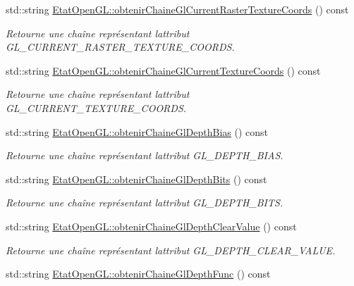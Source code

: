\begin{DoxyCompactItemize}
std\+::string \hyperlink{group__utilitaire_gae1b30e504db9237dce13eade239c8c5a}{Etat\+Open\+G\+L\+::obtenir\+Chaine\+Gl\+Current\+Raster\+Texture\+Coords} () const 
\begin{DoxyCompactList}\small\item\em Retourne une chaîne représentant l\textquotesingle{}attribut G\+L\+\_\+\+C\+U\+R\+R\+E\+N\+T\+\_\+\+R\+A\+S\+T\+E\+R\+\_\+\+T\+E\+X\+T\+U\+R\+E\+\_\+\+C\+O\+O\+R\+D\+S. \end{DoxyCompactList}\item 
std\+::string \hyperlink{group__utilitaire_ga5bf6abadfe9d63e576d34c94c93ee8f0}{Etat\+Open\+G\+L\+::obtenir\+Chaine\+Gl\+Current\+Texture\+Coords} () const 
\begin{DoxyCompactList}\small\item\em Retourne une chaîne représentant l\textquotesingle{}attribut G\+L\+\_\+\+C\+U\+R\+R\+E\+N\+T\+\_\+\+T\+E\+X\+T\+U\+R\+E\+\_\+\+C\+O\+O\+R\+D\+S. \end{DoxyCompactList}\item 
std\+::string \hyperlink{group__utilitaire_gae3e587b7e9f860f3874823a3c4ab7d71}{Etat\+Open\+G\+L\+::obtenir\+Chaine\+Gl\+Depth\+Bias} () const 
\begin{DoxyCompactList}\small\item\em Retourne une chaîne représentant l\textquotesingle{}attribut G\+L\+\_\+\+D\+E\+P\+T\+H\+\_\+\+B\+I\+A\+S. \end{DoxyCompactList}\item 
std\+::string \hyperlink{group__utilitaire_gae1dffc44c8e27d7cb249064cfe35653e}{Etat\+Open\+G\+L\+::obtenir\+Chaine\+Gl\+Depth\+Bits} () const 
\begin{DoxyCompactList}\small\item\em Retourne une chaîne représentant l\textquotesingle{}attribut G\+L\+\_\+\+D\+E\+P\+T\+H\+\_\+\+B\+I\+T\+S. \end{DoxyCompactList}\item 
std\+::string \hyperlink{group__utilitaire_gad8b3e2701fb07b0178b5015868818509}{Etat\+Open\+G\+L\+::obtenir\+Chaine\+Gl\+Depth\+Clear\+Value} () const 
\begin{DoxyCompactList}\small\item\em Retourne une chaîne représentant l\textquotesingle{}attribut G\+L\+\_\+\+D\+E\+P\+T\+H\+\_\+\+C\+L\+E\+A\+R\+\_\+\+V\+A\+L\+U\+E. \end{DoxyCompactList}\item 
std\+::string \hyperlink{group__utilitaire_gac0dff9e4aee8f969fe6e688bb407dcc9}{Etat\+Open\+G\+L\+::obtenir\+Chaine\+Gl\+Depth\+Func} () const 

\end{DoxyCompactItemize}

